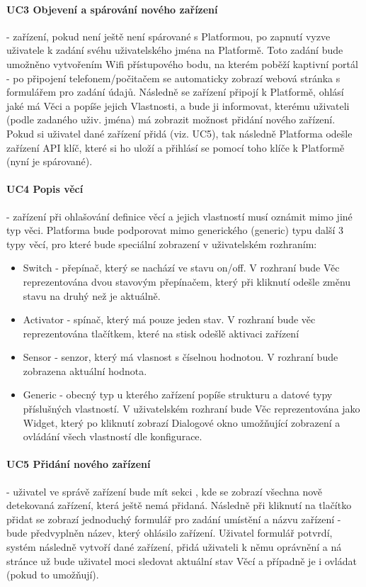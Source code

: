 \paragraph{UC3 Objevení a spárování nového zařízení}
- zařízení, pokud není ještě není spárované s Platformou, po zapnutí vyzve uživatele k zadání svéhu uživatelského jména na Platformě. Toto zadání bude umožněno vytvořením Wifi přístupového bodu, na kterém poběží kaptivní portál - po připojení telefonem/počitačem se automaticky zobrazí webová stránka s formulářem pro zadání údajů. Následně se zařízení připojí k Platformě, ohlásí jaké má Věci a popíše jejich Vlastnosti, a bude ji informovat, kterému uživateli (podle zadaného uživ. jména) má zobrazit možnost přidání nového zařízení. Pokud si uživatel dané zařízení přidá (viz. UC5), tak následně Platforma odešle zařízení API klíč, které si ho uloží a přihlásí se pomocí toho klíče k Platformě (nyní je spárované).

\paragraph{UC4 Popis věcí}
- zařízení při ohlašování definice věcí a jejich vlastností musí oznámit mimo jiné typ věci. Platforma bude podporovat mimo generického (generic) typu další 3 typy věcí, pro které bude speciální zobrazení v uživatelském rozhraním:
\begin{itemize}
    \item Switch - přepínač, který se nachází ve stavu on/off. V rozhraní bude Věc reprezentována dvou stavovým přepínačem, který při kliknutí odešle změnu stavu na druhý než je aktuálně.
    \item Activator - spínač, který má pouze jeden stav. V rozhraní bude věc reprezentována tlačítkem, které na stisk odešlě aktivaci zařízení
    \item Sensor - senzor, který má vlasnost s číselnou hodnotou. V rozhraní bude zobrazena aktuální hodnota.
    \item Generic - obecný typ u kterého zařízení popíše strukturu a datové typy příslušných vlastností. V uživatelském rozhraní bude Věc reprezentována jako Widget, který po kliknutí zobrazí Dialogové okno umožňující zobrazení a ovládání všech vlastností dle konfigurace.
\end{itemize}


\paragraph{UC5 Přidání nového zařízení}
- uživatel ve správě zařízení bude mít sekci , kde se zobrazí všechna nově detekovaná zařízení, která ještě nemá přidaná. Následně při kliknutí na tlačítko přidat se zobrazí jednoduchý formulář pro zadání umístění a názvu zařízení - bude předvyplněn název, který ohlásilo zařízení. Uživatel formulář potvrdí, systém následně vytvoří dané zařízení, přidá uživateli k němu oprávnění a ná stránce  už bude uživatel moci sledovat aktuální stav Věcí a případně je i ovládat (pokud to umožňují).


